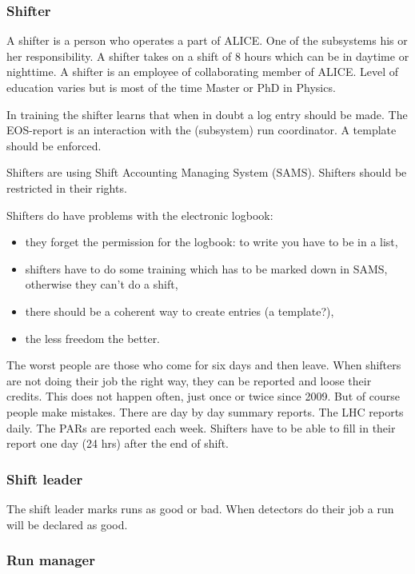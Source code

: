 \subsubsection{Shifter}
A shifter is a person who operates a part of ALICE. One of the subsystems his or her responsibility. A shifter takes on a shift of 8 hours which can be in daytime or nighttime. A shifter is an employee of collaborating member of ALICE. Level of education varies but is most of the time Master or PhD in Physics.

In training the shifter learns that when in doubt a log entry should be made. The EOS-report is an interaction with the (subsystem) run coordinator. A template should be enforced. 

Shifters are using Shift Accounting Managing System (SAMS). Shifters should be restricted in their rights. 

Shifters do have problems with the electronic logbook:
\begin{itemize}
  \item they forget the permission for the logbook: to write you have to be in a list,
  \item shifters have to do some training which has to be marked down in SAMS, otherwise they can't do a shift,
  \item there should be a coherent way to create entries (a template?),
  \item the less freedom the better.
\end{itemize}

The worst people are those who come for six days and then leave. When shifters are not doing their job the right way, they can be reported and loose their credits. This does not happen often, just once or twice since 2009. But of course people make mistakes. There are day by day summary reports. The LHC reports daily. The PARs are reported each week. Shifters have to be able to fill in their report one day (24 hrs) after the end of shift.

\subsubsection{Shift leader}
The shift leader marks runs as good or bad. When detectors do their job a run will be declared as good. 

\subsubsection{Run manager}

